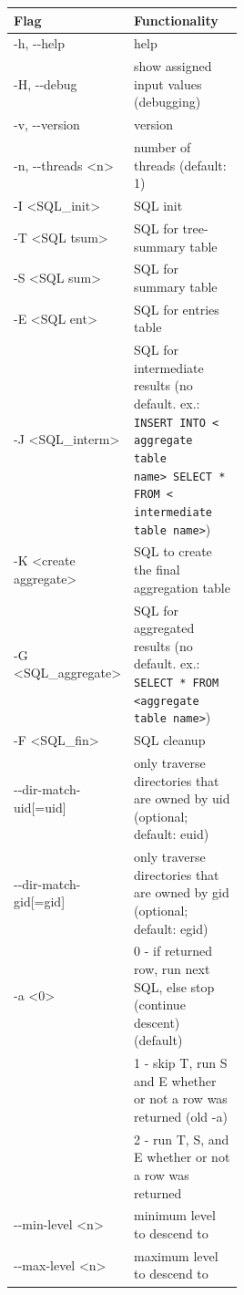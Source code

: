 \begin{longtable}{|l|p{0.5\linewidth}|}
  \hline
  Flag & Functionality \\
  \hline
  -h, -{}-help & help \\
  \hline
  -H, -{}-debug & show assigned input values (debugging) \\
  \hline
  -v, -{}-version & version \\
  \hline
  -n, -{}-threads \textless n\textgreater & number of threads (default: 1) \\
  \hline
  -I \textless SQL\_init\textgreater & SQL init \\
  \hline
  -T \textless SQL tsum\textgreater & SQL for tree-summary table \\
  \hline
  -S \textless SQL sum\textgreater & SQL for summary table \\
  \hline
  -E \textless SQL ent\textgreater & SQL for entries table \\
  \hline
  -J \textless SQL\_interm\textgreater & SQL for intermediate
    results (no default. ex.: \texttt{INSERT INTO \textless
    aggregate table name\textgreater \ SELECT * FROM \textless
    intermediate table name\textgreater}) \\
  \hline
  -K \textless create aggregate\textgreater & SQL to create the final aggregation table \\
  \hline
  -G \textless SQL\_aggregate\textgreater & SQL for aggregated
    results (no default. ex.: \texttt{SELECT * FROM
    \textless aggregate table name\textgreater}) \\
  \hline
  -F \textless SQL\_fin\textgreater & SQL cleanup \\
  \hline
  -{}-dir-match-uid[=uid] & only traverse directories that are owned by
  uid (optional; default: euid) \\
  \hline
  -{}-dir-match-gid[=gid] & only traverse directories that are owned by
  gid (optional; default: egid) \\
  \hline
  -a \textless 0\textbar 1\textbar 2\textgreater & 0 - if returned row, run next SQL, else stop (continue descent) (default) \\
  & 1 - skip T, run S and E whether or not a row was returned (old -a) \\
  & 2 - run T, S, and E whether or not a row was returned \\
  \hline
  -{}-min-level \textless n\textgreater & minimum level to descend to \\
  \hline
  -{}-max-level \textless n\textgreater & maximum level to descend to \\

\end{longtable}
